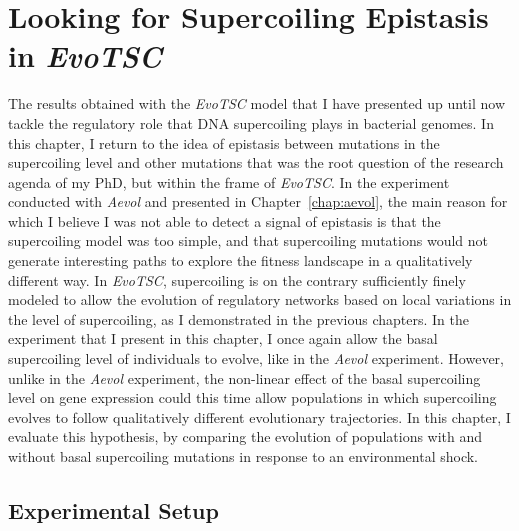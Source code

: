 \chapter{Looking for Supercoiling Epistasis in \emph{EvoTSC}}
\label{chap:epistasis}

The results obtained with the \emph{EvoTSC} model that I have presented up until now tackle the regulatory role that DNA supercoiling plays in bacterial genomes.
In this chapter, I return to the idea of epistasis between mutations in the supercoiling level and other mutations that was the root question of the research agenda of my PhD, but within the frame of \emph{EvoTSC}.
In the experiment conducted with \emph{Aevol} and presented in Chapter~\ref{chap:aevol}, the main reason for which I believe I was not able to detect a signal of epistasis is that the supercoiling model was too simple, and that supercoiling mutations would not generate interesting paths to explore the fitness landscape in a qualitatively different way.
In \emph{EvoTSC}, supercoiling is on the contrary sufficiently finely modeled to allow the evolution of regulatory networks based on local variations in the level of supercoiling, as I demonstrated in the previous chapters.
In the experiment that I present in this chapter, I once again allow the basal supercoiling level of individuals to evolve, like in the \emph{Aevol} experiment.
However, unlike in the \emph{Aevol} experiment, the non-linear effect of the basal supercoiling level on gene expression could this time allow populations in which supercoiling evolves to follow qualitatively different evolutionary trajectories.
In this chapter, I evaluate this hypothesis, by comparing the evolution of populations with and without basal supercoiling mutations in response to an environmental shock.


\section{Experimental Setup}

